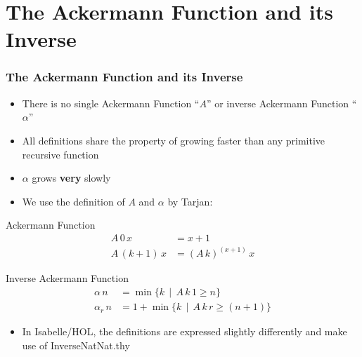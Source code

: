 \section{The Ackermann Function and its Inverse}
\begin{frame}
	\frametitle{The Ackermann Function and its Inverse}
	\begin{itemize}
		\item There is no single Ackermann Function ``$A$'' or inverse Ackermann Function ``$\alpha$''
		\item All definitions share the property of growing faster than any primitive recursive function
		\item $\alpha$ grows \textbf{very} slowly
		\item We use the definition of $A$ and $\alpha$ by Tarjan:
	\end{itemize}
\begin{minipage}{0.45\linewidth}
\begin{dfn} Ackermann Function
	\begin{align*}
	A \, 0 \, x &= x + 1  \\
	A \, (k + 1)\, x &= (A\, k)^{(x + 1)}\, x 
	\end{align*}
\end{dfn}
\end{minipage}
\begin{minipage}{0.45\linewidth}
\begin{dfn} Inverse Ackermann Function
	\begin{align*}
	\alpha \, n &= \min \{ k \,\mid\, A\, k\, 1 \geq n \}\\
	\alpha_r \, n &= 1 + \min\{ k \,\mid\, A\, k\, r \geq (n + 1) \}
	\end{align*}
\end{dfn}
\end{minipage}

\begin{itemize}
	\item In Isabelle/HOL, the definitions are expressed slightly differently and make use of InverseNatNat.thy
\end{itemize}
\end{frame}

